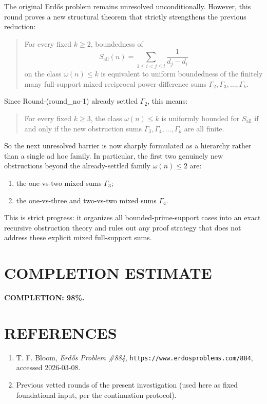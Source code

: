 The original Erd\H{o}s problem remains unresolved unconditionally. However, this round proves a new structural theorem that strictly strengthens the previous reduction:

\begin{quote}
For every fixed \(k\ge 2\), boundedness of
\[
S_{\mathrm{all}}(n)=\sum_{1\le i<j\le t}\frac{1}{d_j-d_i}
\]
on the class \(\omega(n)\le k\) is equivalent to uniform boundedness of the finitely many full-support mixed reciprocal power-difference sums \(\Gamma_2,\Gamma_3,\dots,\Gamma_k\).
\end{quote}

Since Round-(round\_no-1) already settled \(\Gamma_2\), this means:

\begin{quote}
For every fixed \(k\ge 3\), the class \(\omega(n)\le k\) is uniformly bounded for \(S_{\mathrm{all}}\) if and only if the new obstruction sums \(\Gamma_3,\Gamma_4,\dots,\Gamma_k\) are all finite.
\end{quote}

So the next unresolved barrier is now sharply formulated as a hierarchy rather than a single ad hoc family. In particular, the first two genuinely new obstructions beyond the already-settled family \(\omega(n)\le 2\) are:
\begin{enumerate}
\item the one-vs-two mixed sums \(\Gamma_3\);
\item the one-vs-three and two-vs-two mixed sums \(\Gamma_4\).
\end{enumerate}

This is strict progress: it organizes all bounded-prime-support cases into an exact recursive obstruction theory and rules out any proof strategy that does not address these explicit mixed full-support sums.

\section{COMPLETION ESTIMATE}

\noindent \textbf{COMPLETION: 98\%.}

\section{REFERENCES}

\begin{enumerate}
\item T. F. Bloom, \emph{Erd\H{o}s Problem \#884}, \texttt{https://www.erdosproblems.com/884}, accessed 2026-03-08.
\item Previous vetted rounds of the present investigation (used here as fixed foundational input, per the continuation protocol).
\end{enumerate}
